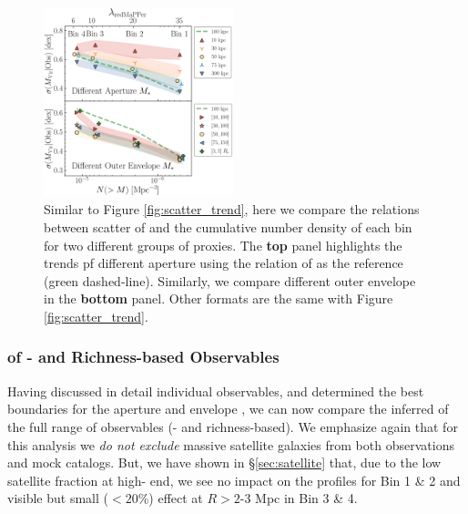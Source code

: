 \documentclass[fleqn,usenatbib,useAMS,english]{mnras}
\begin{document}
  \begin{figure}
      \centering
      \includegraphics[width=0.49\textwidth]{figure/topn_fig_9b}
      \caption{
          Similar to Figure \ref{fig:scatter_trend}, here we compare the relations 
          between scatter of \mvir{} and the cumulative number density of each
          \topn{} bin for two different groups of \mvir{} proxies. 
          The \textbf{top} panel highlights the trends pf different aperture \mstar{} using the 
          relation of  as the reference (green dashed-line). 
          Similarly, we compare different outer envelope \mstar{} in the \textbf{bottom} panel.
          Other formats are the same with Figure \ref{fig:scatter_trend}.
      }
      \label{fig:scatter_trend_3}
  \end{figure}

\subsubsection{\sigmvir{} of \mstar- and Richness-based Observables}
    \label{sec:trend}

    Having discussed in detail individual observables, and determined the best boundaries for the 
    aperture and envelope \mstar{}, we can now compare the inferred \sigmvir{}
    of the full range of observables (\mstar- and richness-based).
    We emphasize again that for this analysis we \emph{do not exclude} massive satellite galaxies
    from both observations and mock catalogs.
    But, we have shown in \S \ref{sec:satellite} that, due to the low satellite fraction at
    high-\mstar{} end, we see no impact on the \dsigma{} profiles for Bin 1 \& 2 and visible but
    small ($<20$\%) effect at $R>2$-3 Mpc in Bin 3 \& 4.
\end{document}
